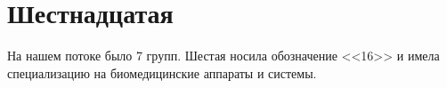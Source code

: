 \newpage
\section*{Шестнадцатая}

На нашем потоке было 7 групп. Шестая носила обозначение <<16>> и имела специализацию на биомедицинские аппараты и системы.

\begin{center}
\end{center}